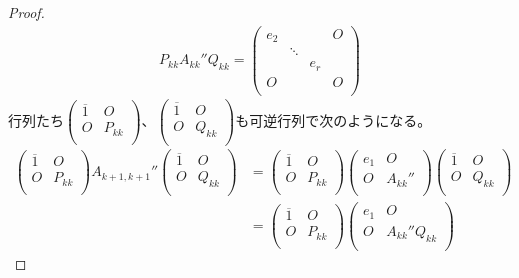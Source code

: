 \documentclass[dvipdfmx]{jsarticle}
\begin{document}
\begin{proof}
\begin{align*}
P_{kk}A_{kk}''Q_{kk} = \begin{pmatrix}
e_{2} & \  & \  & O \\
\  & \ddots & \  & \  \\
\  & \  & e_{r} & \  \\
O & \  & \  & O \\
\end{pmatrix}
\end{align*}
行列たち$\begin{pmatrix}
\overline{1} & O \\
O & P_{kk} \\
\end{pmatrix}$、$\begin{pmatrix}
\overline{1} & O \\
O & Q_{kk} \\
\end{pmatrix}$も可逆行列で次のようになる。
\begin{align*}
\begin{pmatrix}
\overline{1} & O \\
O & P_{kk} \\
\end{pmatrix}A_{k + 1,k + 1}''\begin{pmatrix}
\overline{1} & O \\
O & Q_{kk} \\
\end{pmatrix} &= \begin{pmatrix}
\overline{1} & O \\
O & P_{kk} \\
\end{pmatrix}\begin{pmatrix}
e_{1} & O \\
O & A_{kk}'' \\
\end{pmatrix}\begin{pmatrix}
\overline{1} & O \\
O & Q_{kk} \\
\end{pmatrix}\\
&= \begin{pmatrix}
\overline{1} & O \\
O & P_{kk} \\
\end{pmatrix}\begin{pmatrix}
e_{1} & O \\
O & A_{kk}''Q_{kk} \\

\end{pmatrix}
\end{align*}
\end{proof}
\end{document}
